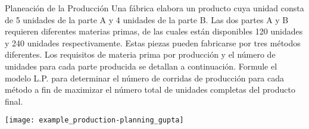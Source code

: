 \begin{frameExample}{Planeación de la Producción}{}
Una fábrica elabora un producto cuya unidad consta de 5 unidades de la parte A y 4 unidades de la parte B. Las dos partes A y B requieren diferentes materias primas, de las cuales están disponibles 120 unidades y 240 unidades respectivamente. Estas piezas pueden fabricarse por tres métodos diferentes. Los requisitos de materia prima por producción y el número de unidades para cada parte producida se detallan a continuación. Formule el modelo L.P. para determinar el número de corridas de producción para cada método a fin de maximizar el número total de unidades completas del producto final.

{\centering
\texttt{[image: example\_production-planning\_gupta]}
\par}


\end{frameExample}



